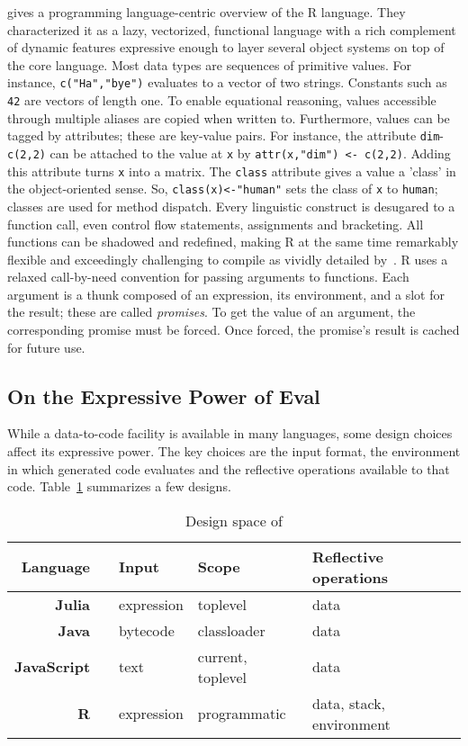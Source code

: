 \documentclass[acmsmall, screen]{acmart}
\renewcommand{\k}[1]{\lstinline |#1|\xspace}
\begin{document}
\citet{ecoop12} gives a programming language-centric overview of the R language.
They characterized it as a lazy, vectorized, functional language with a rich
complement of dynamic features expressive enough to layer several object systems
on top of the core language. Most data types are sequences of primitive values.
For instance, \k{c("Ha","bye")} evaluates to a vector of two strings. Constants
such as \k{42} are vectors of length one. To enable equational reasoning, values
accessible through multiple aliases are copied when written to. Furthermore,
values can be tagged by attributes; these are key-value pairs. For instance, the
attribute \k{dim}-\k{c(2,2)} can be attached to the value at \k{x} by
\k{attr(x,"dim") <- c(2,2)}. Adding this attribute turns \k{x} into a
matrix. The \k{class} attribute gives a value a 'class' in the object-oriented
sense. So, \k{class(x)<-"human"} sets the class of \k{x} to \k{human}; classes
are used for method dispatch. Every linguistic construct is desugared to a
function call, even control flow statements, assignments and bracketing. All
functions can be shadowed and redefined, making R at the same time remarkably
flexible and exceedingly challenging to compile as vividly detailed
by~\citet{dls19}. R uses a relaxed call-by-need convention for passing arguments
to functions. Each argument is a thunk composed of an expression, its
environment, and a slot for the result; these are called \emph{promises}. To get
the value of an argument, the corresponding promise must be forced. Once forced,
the promise's result is cached for future use.

\subsection{On the Expressive Power of Eval}

While a data-to-code facility is available in many languages, some design
choices affect its expressive power. The key choices are the input format, the
environment in which generated code evaluates and the reflective operations
available to that code. Table~\ref{comp} summarizes a few designs.

\begin{table}[!h]\center\small\begin{tabular}{r@{~}llll}\toprule
\tiny\sc Language&&\sc\tiny Input&\sc\tiny Scope&\tiny\sc Reflective operations\\\midrule
\bf Julia&\cite{julia}     & expression& toplevel         & data\\
\bf Java&\cite{cl}  & bytecode  & classloader       & data\\
\bf JavaScript&\cite{ecoop11}& text      & current, toplevel& data\\
\bf R&\cite{R96}  & expression& programmatic      & data, stack, environment\\\bottomrule
\end{tabular}\caption{Design space of \eval}\label{comp}
\end{table}
\end{document}
